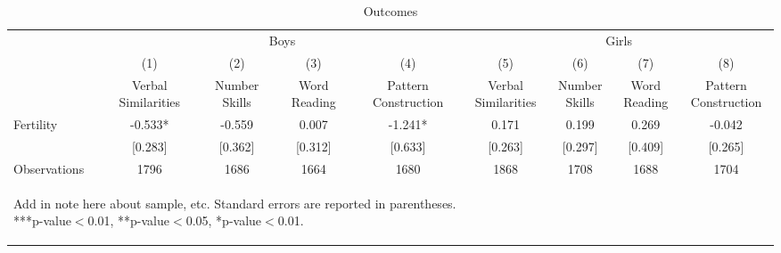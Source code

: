 \begin{table}[htbp]\centering
\def\sym#1{\ifmmode^{#1}\else\(^{#1}\)\fi}
\caption{Outcomes}
\begin{tabular}{l*{8}{c}}
\toprule
                    &\multicolumn{4}{c}{Boys}                                       &\multicolumn{4}{c}{Girls}                                      \\\cmidrule(lr){2-5}\cmidrule(lr){6-9}
                    &\multicolumn{1}{c}{(1)}   &\multicolumn{1}{c}{(2)}   &\multicolumn{1}{c}{(3)}   &\multicolumn{1}{c}{(4)}   &\multicolumn{1}{c}{(5)}   &\multicolumn{1}{c}{(6)}   &\multicolumn{1}{c}{(7)}   &\multicolumn{1}{c}{(8)}   \\
                    &Verbal Similarities   &Number Skills   &Word Reading   &Pattern Construction   &Verbal Similarities   &Number Skills   &Word Reading   &Pattern Construction   \\
\midrule
Fertility           &      -0.533*  &      -0.559   &       0.007   &      -1.241*  &       0.171   &       0.199   &       0.269   &      -0.042   \\
                    &     [0.283]   &     [0.362]   &     [0.312]   &     [0.633]   &     [0.263]   &     [0.297]   &     [0.409]   &     [0.265]   \\
\midrule
Observations        &        1796   &        1686   &        1664   &        1680   &        1868   &        1708   &        1688   &        1704   \\
\bottomrule\multicolumn{5}{p{14.6cm}}{\begin{footnotesize}        
Add in note here about sample, etc. Standard errors are reported in parentheses. ***p-value$<$0.01, **p-value$<$0.05, *p-value$<$0.01.                                
\end{footnotesize}}\end{tabular}\end{table}
